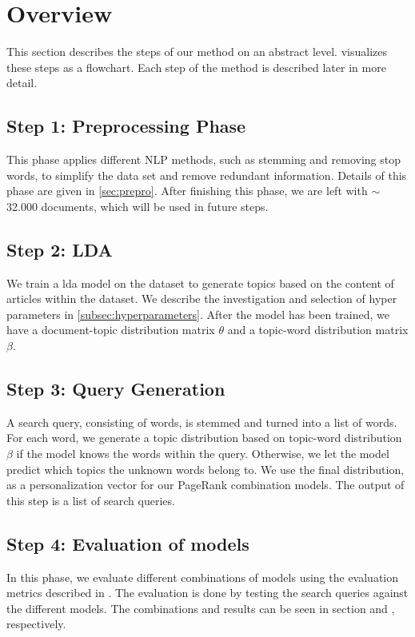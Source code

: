 \section{Overview}\label{sec:method}
This section describes the steps of our method on an abstract level.
 visualizes these steps as a flowchart.
Each step of the method is described later in more detail. 


\subsection*{Step 1: Preprocessing Phase}
This phase applies different \gls{NLP} methods, such as stemming and removing stop words, to simplify the data set and remove redundant information.
Details of this phase are given in \autoref{sec:prepro}.
After finishing this phase, we are left with $\sim$32.000 documents, which will be used in future steps.

\subsection*{Step 2: LDA}
We train a \acrfull{lda} model on the dataset to generate topics based on the content of articles within the dataset. 
We describe the investigation and selection of hyper parameters in \autoref{subsec:hyperparameters}. 
After the model has been trained, we have a document-topic distribution matrix $\theta$ and a topic-word distribution matrix $\beta$.

\subsection*{Step 3: Query Generation}
A search query, consisting of words, is stemmed and turned into a list of words.
For each word, we generate a topic distribution based on topic-word distribution $\beta$ if the model knows the words within the query.
Otherwise, we let the model predict which topics the unknown words belong to.
We use the final distribution, as a personalization vector for our PageRank combination models.
The output of this step is a list of search queries.


\subsection*{Step 4: Evaluation of models}
In this phase, we evaluate different combinations of models using the evaluation metrics described in .
The evaluation is done by testing the search queries against the different models. 
The combinations and results can be seen in section  and , respectively.



